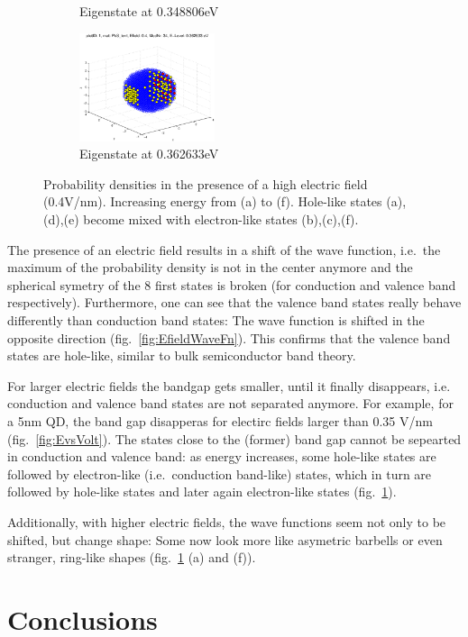 \begin{figure}
\begin{subfigure}{150px}
		\caption{Eigenstate at 0.348806eV}
	\end{subfigure}
	\begin{subfigure}{150px}
		\includegraphics[width=150px]{Fig/Plots/r25v04Mod34}
		\caption{Eigenstate at 0.362633eV}
	\end{subfigure}
	\caption{Probability densities in the presence of a high electric field (0.4V/nm). Increasing energy from (a) to (f). Hole-like states (a),(d),(e) become mixed with electron-like states (b),(c),(f).}
	\label{fig:HighEfieldWaveFn}
\end{figure}


The presence of an electric field results in a shift of the wave function, i.e.~the maximum of the probability density is not in the center anymore and the spherical symetry of the 8 first states is broken (for conduction and valence band respectively). Furthermore, one can see that the valence band states really behave differently than conduction band states: The wave function is shifted in the opposite direction (fig.~\ref{fig:EfieldWaveFn}). This confirms that the valence band states are hole-like, similar to bulk semiconductor band theory. 
	
For larger electric fields the bandgap gets smaller, until it finally disappears, i.e. conduction and valence band states are not separated anymore. For example, for a 5nm  QD, the band gap disapperas for electirc fields larger than 0.35 V/nm (fig.~\ref{fig:EvsVolt}). The states close to the (former) band gap cannot be sepearted in conduction and valence band: as energy increases, some hole-like states are followed by electron-like (i.e.~conduction band-like) states, which in turn are followed by hole-like states and later again electron-like states (fig.~\ref{fig:HighEfieldWaveFn}).
	
Additionally, with higher electric fields, the wave functions seem not only to be shifted, but change shape: Some now look more like asymetric barbells or even stranger, ring-like shapes (fig.~\ref{fig:HighEfieldWaveFn} (a) and (f)).

\FloatBarrier

\section{Conclusions}

